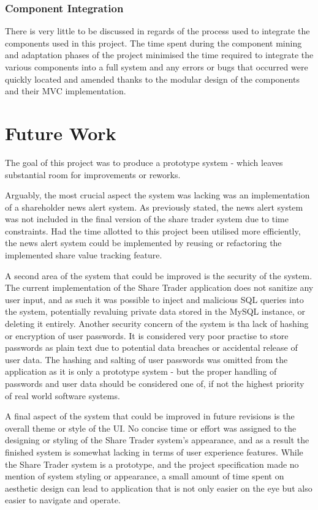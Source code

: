 \documentclass[12pt, a4paper,titlepage]{article}
\begin{document}
\subsubsection{Component Integration}
There is very little to be discussed in regards of the process used to
integrate the components used in this project. 
The time spent during the component mining and adaptation phases of the
project minimised the time required to integrate the various components into a
full system and any errors or bugs that occurred were quickly located and
amended thanks to the modular design of the components and their MVC
implementation.


\section{Future Work}
The goal of this project was to produce a prototype system - which leaves
substantial room for improvements or reworks.

Arguably, the most crucial aspect the system was lacking was an implementation
of a shareholder news alert system.
As previously stated, the news alert system was not included in the final
version of the share trader system due to time constraints.
Had the time allotted to this project been utilised more efficiently, the news
alert system could be implemented by reusing or refactoring the implemented
share value tracking feature.

A second area of the system that could be improved is the security of the
system.
The current implementation of the Share Trader application does not sanitize
any user input, and as such it was possible to inject and malicious SQL
queries into the system, potentially revaluing private data stored in the
MySQL instance, or deleting it entirely.
Another security concern of the system is tha lack of hashing or encryption of
user passwords.
It is considered very poor practise to store passwords as plain text due to
potential data breaches or accidental release of user data.
The hashing and salting of user passwords was omitted from the application as
it is only a prototype system - but the proper handling of passwords and user
data should be considered one of, if not the highest priority of real world
software systems.

A final aspect of the system that could be improved in future revisions is the
overall theme or style of the UI.
No concise time or effort was assigned to the designing or styling of the
Share Trader system's appearance, and as a result the finished system is
somewhat lacking in terms of user experience features.
While the Share Trader system is a prototype, and the project specification
made no mention of system styling or appearance, a small amount of time spent
on aesthetic design can lead to application that is not only easier on the eye
but also easier to navigate and operate.
\end{document}
